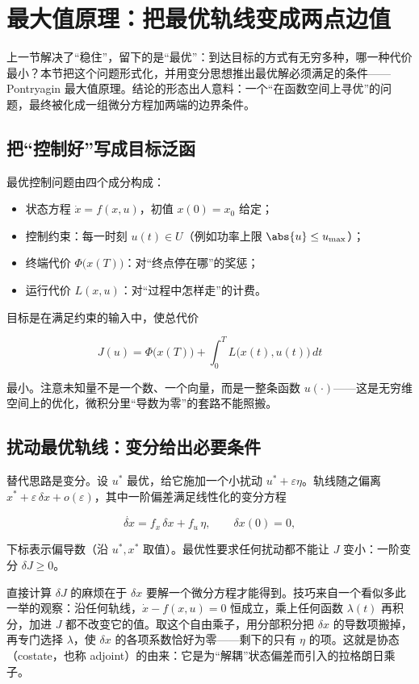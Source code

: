 \section{最大值原理：把最优轨线变成两点边值}

上一节解决了``稳住''，留下的是``最优''：到达目标的方式有无穷多种，哪一种代价最小？本节把这个问题形式化，并用变分思想推出最优解必须满足的条件——Pontryagin 最大值原理。结论的形态出人意料：一个``在函数空间上寻优''的问题，最终被化成一组微分方程加两端的边界条件。

\subsection{把``控制好''写成目标泛函}

最优控制问题由四个成分构成：

\begin{itemize}
\tightlist
\item
  状态方程 \(\dot x=f(x,u)\)，初值 \(x(0)=x_0\) 给定；
\item
  控制约束：每一时刻 \(u(t)\in U\)（例如功率上限 \(\abs{u}\le u_{\max}\)）；
\item
  终端代价 \(\Phi\bigl(x(T)\bigr)\)：对``终点停在哪''的奖惩；
\item
  运行代价 \(L(x,u)\)：对``过程中怎样走''的计费。
\end{itemize}

目标是在满足约束的输入中，使总代价

\[
J(u)=\Phi\bigl(x(T)\bigr)+\int_0^T L\bigl(x(t),u(t)\bigr)\,dt
\]

最小。注意未知量不是一个数、一个向量，而是一整条函数 \(u(\cdot)\)——这是无穷维空间上的优化，微积分里``导数为零''的套路不能照搬。

\subsection{扰动最优轨线：变分给出必要条件}

替代思路是变分。设 \(u^\ast\) 最优，给它施加一个小扰动 \(u^\ast+\varepsilon\eta\)。轨线随之偏离 \(x^\ast+\varepsilon\,\delta x+o(\varepsilon)\)，其中一阶偏差满足线性化的变分方程

\[
\dot{\delta x}=f_x\,\delta x+f_u\,\eta,\qquad \delta x(0)=0,
\]

下标表示偏导数（沿 \(u^\ast,x^\ast\) 取值）。最优性要求任何扰动都不能让 \(J\) 变小：一阶变分 \(\delta J\ge0\)。

直接计算 \(\delta J\) 的麻烦在于 \(\delta x\) 要解一个微分方程才能得到。技巧来自一个看似多此一举的观察：沿任何轨线，\(\dot x-f(x,u)=0\) 恒成立，乘上任何函数 \(\lambda(t)\) 再积分，加进 \(J\) 都不改变它的值。取这个自由乘子，用分部积分把 \(\delta x\) 的导数项搬掉，再专门选择 \(\lambda\)，使 \(\delta x\) 的各项系数恰好为零——剩下的只有 \(\eta\) 的项。这就是协态（costate，也称 adjoint）的由来：它是为``解耦''状态偏差而引入的拉格朗日乘子。

